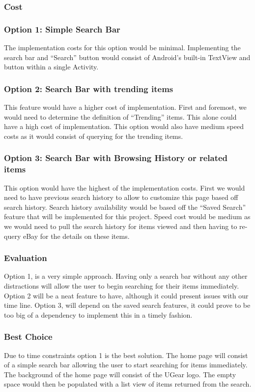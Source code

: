 \documentclass[journal,compsoc, 10pt, draftclsnofoot, onecolumn]{IEEEtran}
\begin{document}
\subsubsection{Cost}
\subsubsection*{Option 1: Simple Search Bar}
The implementation costs for this option would be minimal. Implementing the 
search bar and ``Search'' button would consist of Android's built-in TextView 
and button within a single Activity. 
\subsubsection*{Option 2: Search Bar with trending items}
This feature would have a higher cost of implementation. First and foremost, we 
would need to determine the definition of ``Trending'' items. This alone could 
have a high cost of implementation. This option would also have medium speed 
costs as it would consist of querying for the trending items.
\subsubsection*{Option 3: Search Bar with Browsing History or related items}
This option would have the highest of the implementation costs. First we would 
need to have previous search history to allow to customize this page based off 
search history. Search history availability would be based off the ``Saved 
Search'' feature that will be implemented for this project. Speed cost would 
be medium as we would need to pull the search history for items viewed and then 
having to re-query eBay for the details on these items. 
\subsubsection{Evaluation}
Option 1, is a very simple approach. Having only a search bar without any other 
distractions will allow the user to begin searching for their items immediately. 
Option 2 will be a neat feature to have, although it could present issues with 
our time line. Option 3, will depend on the saved search features, it could prove 
to be too big of a dependency to implement this in a timely fashion.
\subsubsection{Best Choice}
Due to time constraints option 1 is the best solution. The home page will 
consist of a simple search bar allowing the user to start searching for items 
immediately. The background of the home page will consist of the UGear logo. 
The empty space would then be populated with a list view of items returned from the search.
\end{document}
